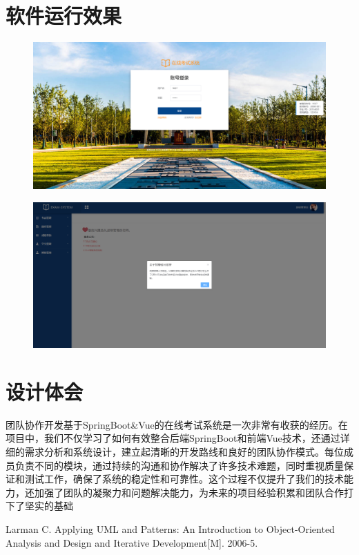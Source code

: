 \documentclass{article}
\begin{document}
\section{软件运行效果}
\begin{figure}[H]
    \centering
    \includegraphics[width=0.8\linewidth]{performance_1.bmp}
\end{figure}
\begin{figure}[H]
    \centering
    \includegraphics[width=0.8\linewidth]{performance_2.bmp}
\end{figure}

\section{设计体会}
团队协作开发基于SpringBoot\&Vue的在线考试系统是一次非常有收获的经历。在项目中，我们不仅学习了如何有效整合后端SpringBoot和前端Vue技术，还通过详细的需求分析和系统设计，建立起清晰的开发路线和良好的团队协作模式。每位成员负责不同的模块，通过持续的沟通和协作解决了许多技术难题，同时重视质量保证和测试工作，确保了系统的稳定性和可靠性。这个过程不仅提升了我们的技术能力，还加强了团队的凝聚力和问题解决能力，为未来的项目经验积累和团队合作打下了坚实的基础

\begin{thebibliography}{99}
Larman C. Applying UML and Patterns: An Introduction to Object-Oriented Analysis and Design and Iterative Development[M]. 2006-5.
\end{thebibliography}
\end{document}

